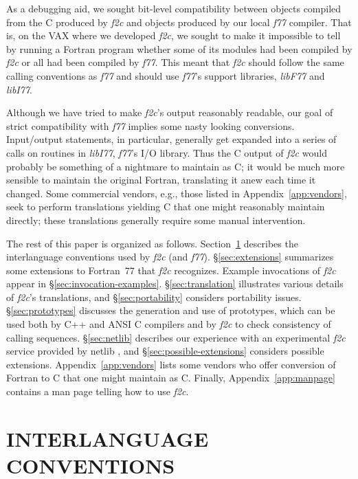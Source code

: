 \documentclass[10pt,a4paper]{article}
\begin{document}
As a debugging aid, we sought bit-level compatibility between objects compiled from the C produced by \emph{f2c} and objects produced by our local \emph{f77} compiler. That is, on the VAX where we developed \emph{f2c}, we sought to make it impossible to tell by running a Fortran program whether some of its modules had been compiled by \emph{f2c} or all had been compiled by \emph{f77}. This meant that \emph{f2c} should follow the same calling conventions as \emph{f77} \citep{6} and should use \emph{f77}’s support libraries, \emph{libF77} and \emph{libI77}.

Although we have tried to make \emph{f2c}’s output reasonably readable, our goal of strict compatibility with \emph{f77} implies some nasty looking conversions. Input/output statements, in particular, generally get expanded into a series of calls on routines in \emph{libI77}, \emph{f77}’s I/O library. Thus the C output of \emph{f2c} would probably be something of a nightmare to maintain as C; it would be much more sensible to maintain the original Fortran, translating it anew each time it changed. Some commercial vendors, e.g., those listed in Appendix~\ref{app:vendors}, seek to perform translations yielding C that one might reasonably maintain directly; these translations generally require some manual intervention.

The rest of this paper is organized as follows. Section~\ref{sec:interlang} describes the interlanguage conventions used by \emph{f2c} (and \emph{f77}). §\ref{sec:extensions} summarizes some extensions to Fortran~77 that \emph{f2c} recognizes. Example invocations of \emph{f2c} appear in §\ref{sec:invocation-examples}. §\ref{sec:translation} illustrates various details of \emph{f2c}’s translations, and §\ref{sec:portability} considers portability issues. §\ref{sec:prototypes} discusses the generation and use of prototypes, which can be used both by C++ and ANSI C compilers and by \emph{f2c} to check consistency of calling sequences. §\ref{sec:netlib} describes our experience with an experimental \emph{f2c} service provided by netlib \citep{5}, and §\ref{sec:possible-extensions} considers possible extensions. Appendix~\ref{app:vendors} lists some vendors who offer conversion of Fortran to C that one might maintain as C. Finally, Appendix~\ref{app:manpage} contains a man page telling how to use \emph{f2c}.

\section{INTERLANGUAGE CONVENTIONS} \label{sec:interlang}
\end{document}
